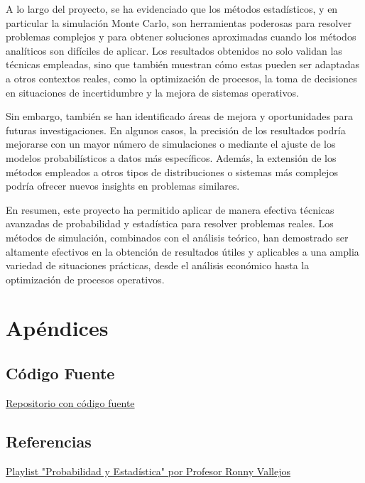\documentclass[12pt]{article}
\begin{document}
A lo largo del proyecto, se ha evidenciado que los métodos estadísticos, y en particular la simulación Monte Carlo, son herramientas poderosas para resolver problemas complejos y para obtener soluciones aproximadas cuando los métodos analíticos son difíciles de aplicar. Los resultados obtenidos no solo validan las técnicas empleadas, sino que también muestran cómo estas pueden ser adaptadas a otros contextos reales, como la optimización de procesos, la toma de decisiones en situaciones de incertidumbre y la mejora de sistemas operativos.

Sin embargo, también se han identificado áreas de mejora y oportunidades para futuras investigaciones. En algunos casos, la precisión de los resultados podría mejorarse con un mayor número de simulaciones o mediante el ajuste de los modelos probabilísticos a datos más específicos. Además, la extensión de los métodos empleados a otros tipos de distribuciones o sistemas más complejos podría ofrecer nuevos insights en problemas similares.

En resumen, este proyecto ha permitido aplicar de manera efectiva técnicas avanzadas de probabilidad y estadística para resolver problemas reales. Los métodos de simulación, combinados con el análisis teórico, han demostrado ser altamente efectivos en la obtención de resultados útiles y aplicables a una amplia variedad de situaciones prácticas, desde el análisis económico hasta la optimización de procesos operativos.


\section{Apéndices}
\subsection{Código Fuente}
\href{https://github.com/Karimtek/MAT043-PRO}{Repositorio con código fuente}


\subsection{Referencias}

\href{https://www.youtube.com/playlist?list=PLRdsr8w_wLNzYYSYP6bvf1p30mo27X9q-}{Playlist "Probabilidad y Estadística" por Profesor Ronny Vallejos}
\end{document}
